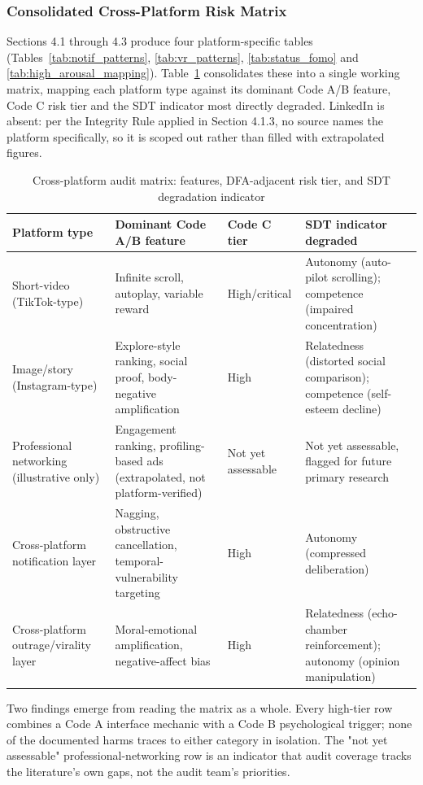 \documentclass[11pt]{article}
\begin{document}
\subsubsection{Consolidated Cross-Platform Risk Matrix}
\label{sec:audit_table_findings} Sections 4.1 through 4.3 produce four platform-specific tables (Tables~\ref{tab:notif_patterns}, \ref{tab:vr_patterns}, \ref{tab:status_fomo} and \ref{tab:high_arousal_mapping}). Table~\ref{tab:cross_platform_matrix} consolidates these into a single working matrix, mapping each platform type against its dominant Code A/B feature, Code C risk tier and the SDT indicator most directly degraded. LinkedIn is absent: per the Integrity Rule applied in Section 4.1.3, no source names the platform specifically, so it is scoped out rather than filled with extrapolated figures. \begin{table}[H] \centering \caption{Cross-platform audit matrix: features, DFA-adjacent risk tier, and SDT degradation indicator} \label{tab:cross_platform_matrix} \begin{tabular}{p{2.6cm}p{3.4cm}p{2.1cm}p{4.4cm}} \hline Platform type & Dominant Code A/B feature & Code C tier & SDT indicator degraded \\ \hline Short-video (TikTok-type) & Infinite scroll, autoplay, variable reward \parencites[2]{8958037}[2]{3303310} & High/critical & Autonomy (auto-pilot scrolling); competence (impaired concentration) \\ Image/story (Instagram-type) & Explore-style ranking, social proof, body-negative amplification \parencites[3]{3303310} & High & Relatedness (distorted social comparison); competence (self-esteem decline) \\ Professional networking (illustrative only) & Engagement ranking, profiling-based ads (extrapolated, not platform-verified) \parencites[2]{6502223}[4]{6941611} & Not yet assessable & Not yet assessable, flagged for future primary research \\ Cross-platform notification layer & Nagging, obstructive cancellation, temporal-vulnerability targeting \parencites[8]{6295677}[138]{8745065} & High & Autonomy (compressed deliberation) \\ Cross-platform outrage/virality layer & Moral-emotional amplification, negative-affect bias \parencites[7]{6502223}[3]{3303310} & High & Relatedness (echo-chamber reinforcement); autonomy (opinion manipulation) \\ \hline \end{tabular} \end{table} Two findings emerge from reading the matrix as a whole. Every high-tier row combines a Code A interface mechanic with a Code B psychological trigger; none of the documented harms traces to either category in isolation. The "not yet assessable" professional-networking row is an indicator that audit coverage tracks the literature's own gaps, not the audit team's priorities.
\end{document}
